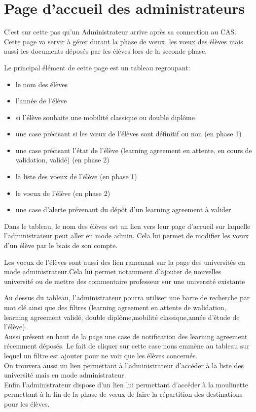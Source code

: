 \section{Page d'accueil des administrateurs}

C'est sur cette pas qu'un Administrateur arrive après sa connection au CAS. Cette page va servir à gérer durant la phase de vœux, les vœux des élèves mais aussi les documents déposés par les élèves lors de la seconde phase.

Le principal élément de cette page est un tableau regroupant:
\begin{itemize}
 	\item le nom des élèves
 	\item l'année de l'élève
 	\item si l'élève souhaite une mobilité classique ou double diplôme
 	\item une case précisant si les vœux de l'élèves sont définitif ou non (en phase 1)
 	\item une case précisant l'état de l'élève (learning agreement en attente, en cours de validation, validé) (en phase 2)
 	\item la liste des voeux de l'élève (en phase 1)
 	\item le voeux de l'élève (en phase 2)
 	\item une case d'alerte prévenant du dépôt d'un learning agreement à valider
 \end{itemize}
 
Dans le tableau, le nom des élèves est un lien vers leur page d'accueil sur laquelle l'administrateur peut aller en mode admin. Cela lui permet de modifier les vœux d'un élève par le biais de son compte.

Les voeux de l'élèves sont aussi des lien ramenant sur la page des universités en mode administrateur.Cela lui permet notamment d'ajouter de nouvelles université ou de mettre des commentaire professeur sur une université existante

Au dessus du tableau, l'administrateur pourra utiliser une barre de recherche par mot clé ainsi que des filtres (learning agreement en attente de walidation, learning agreement validé, double diplôme,mobilité classique,année d'étude de l'élève).\\

Aussi présent en haut de la page une case de notification des learning agreement récemment déposés. Le fait de cliquer sur cette case nous emmène au tableau sur lequel un filtre est ajouter pour ne voir que les élèves concernés.\\

On trouvera aussi un lien permettant à l'administrateur d'accéder à la liste des université mais en mode administrateur.\\

Enfin l'administrateur dispose d'un lien lui permettant d'accéder à la moulinette permettant à la fin de la phase de vœux de faire la répartition des destinations pour les élèves.